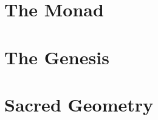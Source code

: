 \documentclass[12pt,a4paper]{book}
\begin{document}
\tableofcontents

\part{The Monad}

% 

\part{The Genesis}

% 

% 

% 

% 

% 

% 



% 

% 

% 

\part{Sacred Geometry}

% 

% 

% 

% 

% 
\end{document}
